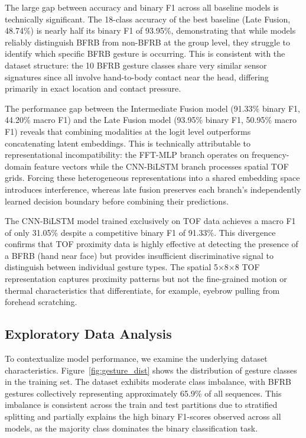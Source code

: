 \documentclass[conference]{IEEEtran}
\begin{document}
The large gap between accuracy and binary F1 across all
baseline models is technically significant. The 18-class
accuracy of the best baseline (Late Fusion, 48.74\%) is
nearly half its binary F1 of 93.95\%, demonstrating that
while models reliably distinguish BFRB from non-BFRB at
the group level, they struggle to identify which specific
BFRB gesture is occurring. This is consistent with the
dataset structure: the 10 BFRB gesture classes share very
similar sensor signatures since all involve hand-to-body
contact near the head, differing primarily in exact location
and contact pressure.

The performance gap between the Intermediate Fusion model
(91.33\% binary F1, 44.20\% macro F1) and the Late Fusion
model (93.95\% binary F1, 50.95\% macro F1) reveals that
combining modalities at the logit level outperforms
concatenating latent embeddings. This is technically
attributable to representational incompatibility: the
FFT-MLP branch operates on frequency-domain feature vectors
while the CNN-BiLSTM branch processes spatial TOF grids.
Forcing these heterogeneous representations into a shared
embedding space introduces interference, whereas late fusion
preserves each branch's independently learned decision
boundary before combining their predictions.

The CNN-BiLSTM model trained exclusively on TOF data
achieves a macro F1 of only 31.05\% despite a competitive
binary F1 of 91.33\%. This divergence confirms that TOF
proximity data is highly effective at detecting the
presence of a BFRB (hand near face) but provides
insufficient discriminative signal to distinguish between
individual gesture types. The spatial 5$\times$8$\times$8
TOF representation captures proximity patterns but not
the fine-grained motion or thermal characteristics that
differentiate, for example, eyebrow pulling from forehead
scratching.

\subsection{Exploratory Data Analysis}
 
To contextualize model performance, we examine the underlying dataset characteristics. Figure~\ref{fig:gesture_dist} shows the distribution of gesture classes in the training set. The dataset exhibits moderate class imbalance, with BFRB gestures collectively representing approximately 65.9\% of all sequences. This imbalance is consistent across the train and test partitions due to stratified splitting and partially explains the high binary F1-scores observed across all models, as the majority class dominates the binary classification task.
\end{document}
